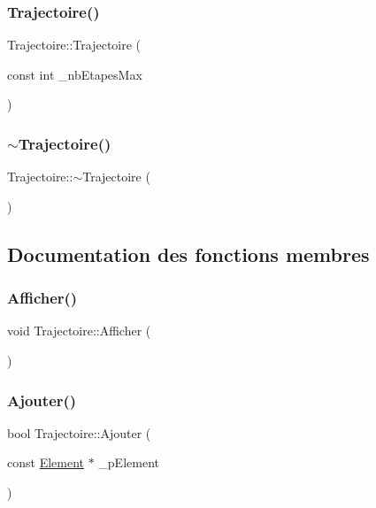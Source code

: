 \subsubsection{\texorpdfstring{Trajectoire()}{Trajectoire()}}
{\footnotesize\ttfamily Trajectoire\+::\+Trajectoire (\begin{DoxyParamCaption}\item[{const int}]{\+\_\+nb\+Etapes\+Max }\end{DoxyParamCaption})}

\mbox{\label{class_trajectoire_a9249a7bd01726684494eeea9fde54b9e}} 
\subsubsection{\texorpdfstring{$\sim$\+Trajectoire()}{~Trajectoire()}}
{\footnotesize\ttfamily Trajectoire\+::$\sim$\+Trajectoire (\begin{DoxyParamCaption}{ }\end{DoxyParamCaption})}



\subsection{Documentation des fonctions membres}
\mbox{\label{class_trajectoire_ab2ab026cbcf416f397ff6ee7f8331cc4}} 
\subsubsection{\texorpdfstring{Afficher()}{Afficher()}}
{\footnotesize\ttfamily void Trajectoire\+::\+Afficher (\begin{DoxyParamCaption}{ }\end{DoxyParamCaption})}

\mbox{\label{class_trajectoire_a12ae44f39805bb480c2f8bf3454ea342}} 
\subsubsection{\texorpdfstring{Ajouter()}{Ajouter()}}
{\footnotesize\ttfamily bool Trajectoire\+::\+Ajouter (\begin{DoxyParamCaption}\item[{const \hyperlink{class_element}{Element} $\ast$}]{\+\_\+p\+Element }\end{DoxyParamCaption})}



